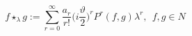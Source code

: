 \begin{equation}\label{eq61:ps}
f\star_{\lambda}g:=\sum^{\infty}_{r=0}\frac{a_{r}}{r!}\Big(i\frac{\vartheta}{2}\Big)^{r}P^{r}(f,g)\lambda^{r},~~f,g\in N
\end{equation}

